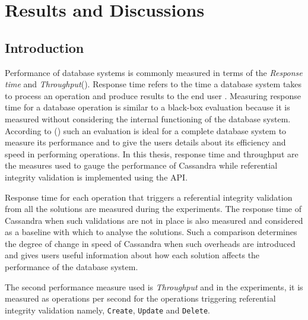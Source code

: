 \chapter{Results and Discussions}
\section{Introduction}
Performance of database systems is commonly measured in terms of the
\textit{Response time} and \textit{Throughput}().
Response time refers to the time  a database system takes to process an
operation and produce results to the end user . Measuring response time for a
database operation is similar to a black-box evaluation because it is measured
without considering the internal functioning  of the database system. According
to () such an evaluation is ideal for a complete database
system to measure its performance and to give the users details about its
efficiency and speed in performing operations. In this thesis, response time and
throughput are the measures used to gauge the performance of Cassandra while
referential integrity validation is implemented using the \ac{API}.

Response time for each  operation that triggers  a referential integrity
validation from all the solutions are measured during the experiments.
The response time of Cassandra when such validations
are not in place is also measured and considered as a baseline with which to
analyse the solutions. Such a comparison determines the degree of change in
speed of Cassandra when such overheads are introduced and gives users useful
information about how each solution affects the performance of the database
system.

The second performance measure used is \textit{Throughput} and in the
experiments, it is measured as operations per second for  the operations
triggering referential integrity validation namely, \texttt{Create},
\texttt{Update} and \texttt{Delete}.


